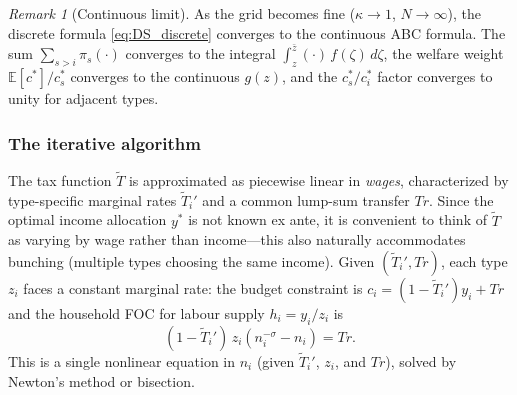 \documentclass[12pt,a4paper]{article}
\theoremstyle{definition}
\theoremstyle{plain}
\theoremstyle{remark}
\newtheorem{remark}{Remark}[section]
\newcommand{\E}{\mathbb{E}}
\newcommand{\zbar}{\bar{z}}
\begin{document}
\begin{remark}[Continuous limit]
As the grid becomes fine ($\kappa \to 1$, $N \to \infty$), the discrete formula \eqref{eq:DS_discrete} converges to the continuous ABC formula. The sum $\sum_{s>i} \pi_s(\cdot)$ converges to the integral $\int_z^{\zbar}(\cdot)\,f(\zeta)\,d\zeta$, the welfare weight $\E[c^*]/c_s^*$ converges to the continuous $g(z)$, and the $c_s^*/c_i^*$ factor converges to unity for adjacent types.
\end{remark}

\subsubsection{The iterative algorithm}

The tax function $\tilde{T}$ is approximated as piecewise linear in \emph{wages}, characterized by type-specific marginal rates $\tilde{T}_i'$ and a common lump-sum transfer $\mathit{Tr}$. Since the optimal income allocation $y^*$ is not known ex ante, it is convenient to think of $\tilde{T}$ as varying by wage rather than income---this also naturally accommodates bunching (multiple types choosing the same income). Given $(\tilde{T}_i', \mathit{Tr})$, each type $z_i$ faces a constant marginal rate: the budget constraint is $c_i = (1-\tilde{T}_i')y_i + \mathit{Tr}$ and the household FOC for labour supply $h_i = y_i/z_i$ is
\begin{equation}
  (1 - \tilde{T}_i')\,z_i\left(n_i^{-\sigma} - n_i\right) = \mathit{Tr}.
  \label{eq:hh_foc_tf}
\end{equation}
This is a single nonlinear equation in $n_i$ (given $\tilde{T}_i'$, $z_i$, and $\mathit{Tr}$), solved by Newton's method or bisection.
\end{document}
